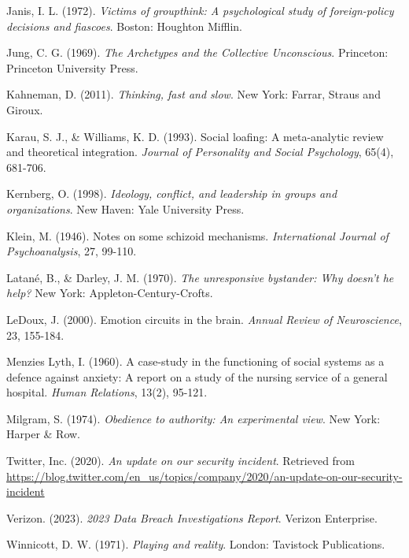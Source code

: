 \documentclass[11pt,a4paper]{article}
\begin{document}
\begin{thebibliography}{99}
Janis, I. L. (1972). \textit{Victims of groupthink: A psychological study of foreign-policy decisions and fiascoes}. Boston: Houghton Mifflin.

Jung, C. G. (1969). \textit{The Archetypes and the Collective Unconscious}. Princeton: Princeton University Press.

Kahneman, D. (2011). \textit{Thinking, fast and slow}. New York: Farrar, Straus and Giroux.

Karau, S. J., \& Williams, K. D. (1993). Social loafing: A meta-analytic review and theoretical integration. \textit{Journal of Personality and Social Psychology}, 65(4), 681-706.

Kernberg, O. (1998). \textit{Ideology, conflict, and leadership in groups and organizations}. New Haven: Yale University Press.

Klein, M. (1946). Notes on some schizoid mechanisms. \textit{International Journal of Psychoanalysis}, 27, 99-110.

Latané, B., \& Darley, J. M. (1970). \textit{The unresponsive bystander: Why doesn't he help?} New York: Appleton-Century-Crofts.

LeDoux, J. (2000). Emotion circuits in the brain. \textit{Annual Review of Neuroscience}, 23, 155-184.

Menzies Lyth, I. (1960). A case-study in the functioning of social systems as a defence against anxiety: A report on a study of the nursing service of a general hospital. \textit{Human Relations}, 13(2), 95-121.

Milgram, S. (1974). \textit{Obedience to authority: An experimental view}. New York: Harper \& Row.

Twitter, Inc. (2020). \textit{An update on our security incident}. Retrieved from \url{https://blog.twitter.com/en_us/topics/company/2020/an-update-on-our-security-incident}

Verizon. (2023). \textit{2023 Data Breach Investigations Report}. Verizon Enterprise.

Winnicott, D. W. (1971). \textit{Playing and reality}. London: Tavistock Publications.

\end{thebibliography}
\end{document}
